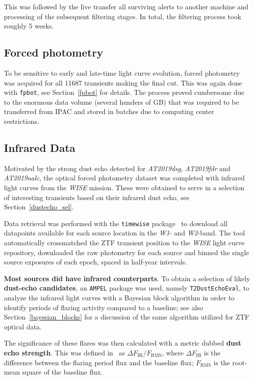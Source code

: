 This was followed by the live transfer all surviving alerts to another machine and processing of the subsequent filtering stages. In total, the filtering process took roughly 5 weeks.

\subsection{Forced photometry}
To be sensitive to early and late-time light curve evolution, forced photometry was acquired for all 11687 transients making the final cut. This was again done with \texttt{fpbot}, see Section~\ref{fpbot} for details. The process proved cumbersome due to the enormous data volume (several hunders of GB) that was required to be transferred from IPAC and stored in batches due to computing center restrictions.

\subsection{Infrared Data}\label{irdata}
Motivated by the strong dust echo detected for \textit{AT2019dsg}, \textit{AT2019fdr} and \textit{AT2019aalc}, the optical forced photometry dataset was completed with infrared light curves from the \textit{WISE} mission. These were obtained to serve in a selection of interesting transients based on their infrared dust echo, see Section~\ref{dustecho_sel}.

Data retrieval was performed with the \texttt{timewise} package~ to download all datapoints available for each source location in the \textit{W1}- and \textit{W2}-band. The tool automatically crossmatched the ZTF transient position to the \textit{WISE} light curve repository, downloaded the raw photometry for each source and binned the single source exposures of each epoch, spaced in half-year intervals.

\textbf{Most sources did have infrared counterparts}. To obtain a selection of likely \textbf{dust-echo candidates}, an \texttt{AMPEL} package was used, namely \texttt{T2DustEchoEval}, to analyze the infrared light curves with a Bayesian block algorithm in order to identify periods of flaring activity compared to a baseline; see also Section~\ref{bayesian_blocks} for a discussion of the same algorithm utilized for ZTF optical data.

The significance of these flares was then calculated with a metric dubbed \textbf{dust echo strength}. This was defined in~\cite{Velzen2021} as $\Delta F_\text{IR}/F_\text{RMS}$, where $\Delta F_\text{IR}$ is the difference between the flaring period flux and the baseline flux; $F_\text{RMS}$ is the root-mean square of the baseline flux.

